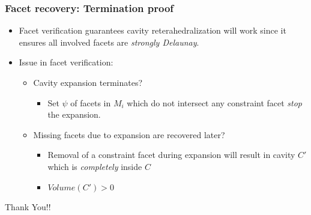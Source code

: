 \documentclass{beamer}
\begin{document}
\begin{frame}
\frametitle{Facet recovery: Termination proof}
    \begin{itemize}
        \item Facet verification guarantees cavity reterahedralization will work since it ensures all involved facets are \textit{strongly Delaunay}.
        \item Issue in facet verification: \newline
        \begin{itemize}
            \item Cavity expansion terminates?
            \begin{itemize}
                \item Set $\psi$ of facets in $M_{i}$ which do not intersect any constraint facet \textit{stop} the expansion.
            \end{itemize}
            \item Missing facets due to expansion are recovered later?
            \begin{itemize}
                \item Removal of a constraint facet during expansion will result in cavity $C'$ which is \textit{completely} inside $C$
                \item $Volume(C') > 0$
            \end{itemize}
        \end{itemize}
    \end{itemize}
\end{frame}

\begin{frame}
	Thank You!!
\end{frame}
\end{document}
